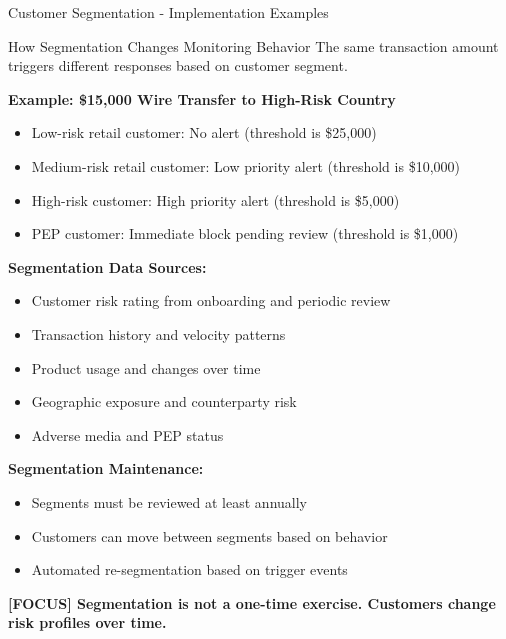 \documentclass[11pt,a4paper]{beamer}
\newcommand{\examfocus}[1]{\textcolor{orange!80!black}{\textbf{[FOCUS] #1}}}
\begin{document}
	\begin{frame}{Customer Segmentation - Implementation Examples}
		\begin{block}{How Segmentation Changes Monitoring Behavior}
			The same transaction amount triggers different responses based on customer segment.
		\end{block}
		
		\textbf{Example: \$15,000 Wire Transfer to High-Risk Country}
		\begin{itemize}
			\item Low-risk retail customer: No alert (threshold is \$25,000)
			\item Medium-risk retail customer: Low priority alert (threshold is \$10,000)
			\item High-risk customer: High priority alert (threshold is \$5,000)
			\item PEP customer: Immediate block pending review (threshold is \$1,000)
		\end{itemize}
		
		\textbf{Segmentation Data Sources:}
		\begin{itemize}
			\item Customer risk rating from onboarding and periodic review
			\item Transaction history and velocity patterns
			\item Product usage and changes over time
			\item Geographic exposure and counterparty risk
			\item Adverse media and PEP status
		\end{itemize}
		
		\textbf{Segmentation Maintenance:}
		\begin{itemize}
			\item Segments must be reviewed at least annually
			\item Customers can move between segments based on behavior
			\item Automated re-segmentation based on trigger events
		\end{itemize}
		
		\examfocus{Segmentation is not a one-time exercise. Customers change risk profiles over time.}
	\end{frame}
	
\end{document}
